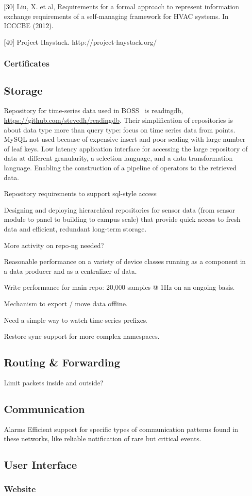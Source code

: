 [30] Liu, X. et al, Requirements for a formal approach to represent information exchange requirements of a self-managing framework for HVAC systems. In ICCCBE (2012). 

[40] Project Haystack. http://project-haystack.org/  


\subsubsection{Certificates}

\subsection{Storage}

Repository for time-series data used in BOSS~\cite{Dawson-Haggerty2013BOSS} is readingdb, \url{https://github.com/stevedh/readingdb}.
Their simplification of repositories is about data type more than query type:  focus on time series data from points. 
MySQL not used because of expensive insert and poor scaling with large number of leaf keys.
Low latency application interface for accessing the large repository of data at different granularity, a selection language, and a data transformation language. Enabling the construction of a pipeline of operators to the retrieved data. 

Repository requirements to support sql-style access

Designing and deploying hierarchical repositories for sensor data (from sensor module to panel to building to campus scale) that provide quick access to fresh data and efficient, redundant long-term storage. 

More activity on repo-ng needed? 

Reasonable performance on a variety of device classes  running as a component in a data producer and as a centralizer of data. 

Write performance for main repo:  20,000 samples @ 1Hz on an ongoing basis.  

Mechanism to export / move data offline. 

Need a simple way to watch time-series prefixes. 

Restore sync support for more complex namespaces. 

\subsection{Routing \& Forwarding}

Limit packets inside and outside? 

\subsection{Communication}
Alarms
Efficient support for specific types of communication patterns found in these networks, like reliable notification of rare but critical events. 


\subsection{User Interface}
\subsubsection{Website}
